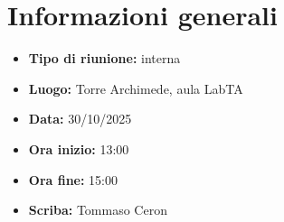 \section{Informazioni generali}

\begin{itemize}
    \item \textbf{Tipo di riunione:} interna
    \item \textbf{Luogo:} Torre Archimede, aula LabTA
    \item \textbf{Data:} 30/10/2025
    \item \textbf{Ora inizio:} 13:00
    \item \textbf{Ora fine:} 15:00
    \item \textbf{Scriba:} Tommaso Ceron
\end{itemize}